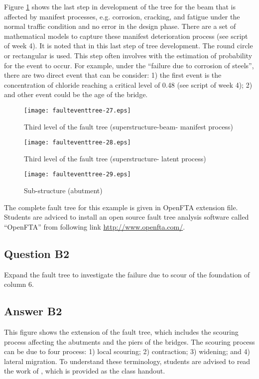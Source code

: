 Figure \ref{figeventfault:11} shows the last step in development of the tree for the beam
that is affected by manifest processes, e.g. corrosion, cracking, and fatigue
under the normal traffic condition and no error in the design phase. There are a
set of mathematical models to capture these manifest deterioration process (see
script of week 4). It is noted that in this last step of tree development. The
round circle or rectangular is used. This step often involves with the estimation
of probability for the event to occur. For example, under the ``failure due to
corrosion of steels'', there are two direct event that can be consider: 1) the
first event is the concentration of chloride reaching a critical level of 0.48
(see script of week 4); 2) and other event could be the age of the bridge.
%
\begin{figure}[ht]
\begin{center}
\texttt{[image: faulteventtree-27.eps]}
\caption{Third level of the fault tree (superstructure-beam- manifest
process)}\label{figeventfault:11}
\end{center}
\end{figure}
%
\begin{figure}[ht]
\begin{center}
\texttt{[image: faulteventtree-28.eps]}
\caption{Third level of the fault tree (superstructure- latent process)}
\end{center}
\end{figure}
%
\begin{figure}[ht]
\begin{center}
\texttt{[image: faulteventtree-29.eps]}
\caption{Sub-structure (abutment)}
\end{center}
\end{figure}

The complete fault tree for this example is given in OpenFTA extension file.
Students are adviced to install an open source fault tree analysis software
called ``OpenFTA'' from following link \href{http://www.openfta.com/}{http://www.openfta.com/}.
\subsection{Question B2}
Expand the fault tree to investigate the failure due to scour of the foundation
of column 6.
\subsection{Answer B2}
This figure shows the extension of the fault tree, which includes the scouring
process affecting the abutments and the piers of the bridges. The scouring
process can be due to four process: 1) local scouring; 2) contraction; 3)
widening; and 4) lateral migration. To understand these terminology, students are
advised to read the work of \cite{Johnson1999}, which is provided as the class handout.

